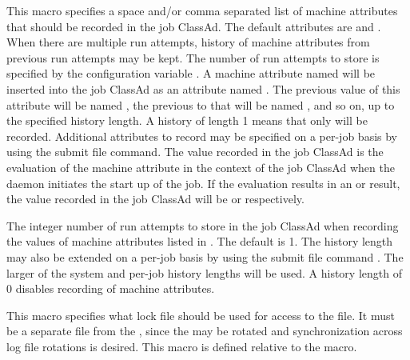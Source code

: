 \begin{description}
\label{param:SystemJobMachineAttrs}
\item[\Macro{SYSTEM\_JOB\_MACHINE\_ATTRS}]
  This macro specifies a space and/or comma separated list of
  machine attributes that should be recorded in the job ClassAd.  The
  default attributes are  and .  When
  there are multiple run attempts, history of machine attributes from
  previous run attempts may be kept.  The number of run attempts to
  store is specified by the configuration variable
  .  A machine
  attribute named  will be inserted into the job ClassAd as an
  attribute named .  The previous value of this
  attribute will be named , the previous to that
  will be named , and so on, up to the specified
  history length.  A history of length 1 means that only 
  will be recorded.  Additional attributes to record may be specified on
  a per-job basis by using the  submit
  file command.  The value recorded in the job ClassAd is the evaluation of
  the machine attribute in the context of the job ClassAd when 
  the 
  daemon initiates the start up of the job.  If the evaluation results in
  an  or  result, 
  the value recorded in the job ClassAd will be
   or  respectively.

\label{param:SystemJobMachineAttrsHistoryLength}
\item[\Macro{SYSTEM\_JOB\_MACHINE\_ATTRS\_HISTORY\_LENGTH}]
  The integer number of run attempts to store in
  the job ClassAd when recording the values of machine attributes listed
  in .  The default is 1.
  The history length may also be extended on a per-job
  basis by using the submit file command
  .  The larger of the
  system and per-job history lengths will be used.  A history length of 0
  disables recording of machine attributes.

\label{param:ScheddLock}
\item[\Macro{SCHEDD\_LOCK}]
  This macro specifies what lock file should be used for access to the
   file.  It must be a separate file from the
  , since the  may be rotated and
  synchronization across log file rotations
  is desired.
  This macro is defined relative to the  macro.


\end{description}
